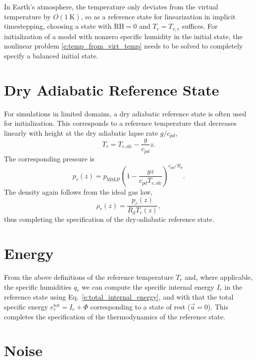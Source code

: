 \documentclass{report}
\begin{document}
In Earth's atmosphere, the temperature only deviates from the virtual temperature by $O(1~\mathrm{K})$, so as a reference state for linearization in implicit timestepping, choosing a state with $\mathrm{RH}=0$ and $T_r = T_{v, r}$ suffices. For initialization of a model with nonzero specific humidity in the initial state, the nonlinear problem \eqref{e:temp_from_virt_temp} needs to be solved to completely specify a balanced initial state.

\section{Dry Adiabatic Reference State}

For simulations in limited domains, a dry adiabatic reference state is often used for initialization. This corresponds to a reference temperature that decreases linearly with height at the dry adiabatic lapse rate $g/c_{pd}$,
\begin{equation}\label{e:temperature_adiabat}
    T_r = T_{r, \mathrm{sfc}} - \frac{g}{c_{pd}} z.
\end{equation}
The corresponding pressure is
\begin{equation}\label{e:pressure_adiabat}
p_r(z) = p_{\mathrm{MSLP}} 
\left(1 - \frac{g z}{c_{pd} T_{v, \mathrm{sfc}}} \right)^{c_{pd}/R_d}.
\end{equation}
The density again follows from the ideal gas law,
\begin{equation}
    \rho_r(z) = \frac{p_r(z)}{R_d T_r(z)},
\end{equation}
thus completing the specification of the dry-adiabatic reference state.

\section{Energy}

From the above definitions of the reference temperature $T_r$ and, where applicable, the specific humidities $q_r$ we can compute the specific internal energy $I_r$ in the reference state using Eq.~\eqref{e:total_internal_energy}, and with that the total specific energy $e^{\mathrm{tot}}_r = I_r + \Phi$ corresponding to a state of rest ($\vec{u}=0$). This completes the specification of the thermodynamics of the reference state.

\section{Noise}
\end{document}
